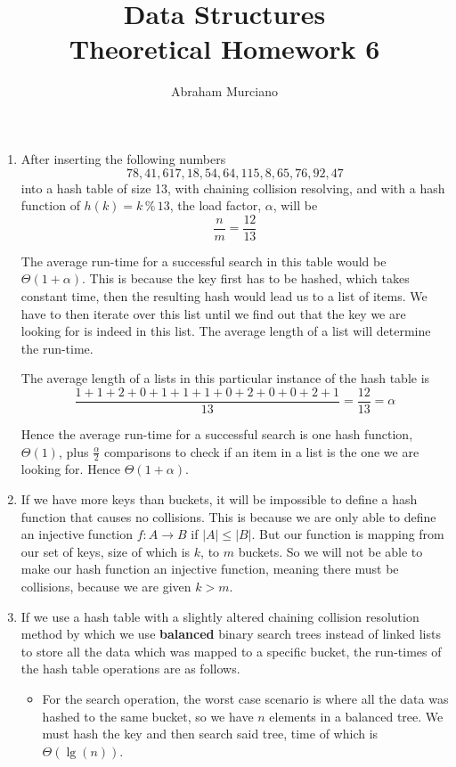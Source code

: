 \documentclass[fleqn]{article}
\title{Data Structures \\
\medskip
\large Theoretical Homework 6}
\author{Abraham Murciano}
\newenvironment{answers}{ %
	\begin{enumerate}
		\setlength{\itemsep}{\bigskipamount}
}{\end{enumerate}}
\DeclareMathOperator{\Mod}{\%}
\begin{document}
\maketitle

\begin{answers}

    \item %
	After inserting the following numbers
	\[78, 41, 617, 18, 54, 64, 115, 8, 65, 76, 92, 47\]
	into a hash table of size 13, with chaining collision resolving, and with a hash function of \(h(k) = k \Mod 13\), the load factor, \(\alpha\), will be
	\[\frac{n}{m} = \frac{12}{13}\]

	The average run-time for a successful search in this table would be \(\Theta(1 + \alpha)\). This is because the key first has to be hashed, which takes constant time, then the resulting hash would lead us to a list of items. We have to then iterate over this list until we find out that the key we are looking for is indeed in this list. The average length of a list will determine the run-time.

	The average length of a lists in this particular instance of the hash table is
	\[\frac{1+1+2+0+1+1+1+0+2+0+0+2+1}{13} = \frac{12}{13} = \alpha\]

	Hence the average run-time for a successful search is one hash function, \(\Theta(1)\), plus \(\frac{\alpha}{2}\) comparisons to check if an item in a list is the one we are looking for. Hence \(\Theta(1 + \alpha)\).

	\item %
	If we have more keys than buckets, it will be impossible to define a hash function that causes no collisions. This is because we are only able to define an injective function \(f: A \to B\) if \(|A| \leq |B|\). But our function is mapping from our set of keys, size of which is \(k\), to \(m\) buckets. So we will not be able to make our hash function an injective function, meaning there must be collisions, because we are given \(k > m\).

	\item %
	If we use a hash table with a slightly altered chaining collision resolution method by which we use \textbf{balanced} binary search trees instead of linked lists to store all the data which was mapped to a specific bucket, the run-times of the hash table operations are as follows.
	\begin{itemize}[listparindent=0pt]
		\item
		For the search operation, the worst case scenario is where all the data was hashed to the same bucket, so we have \(n\) elements in a balanced tree. We must hash the key and then search said tree, time of which is \(\Theta(\lg(n))\).


\end{itemize}
\end{answers}
\end{document}
